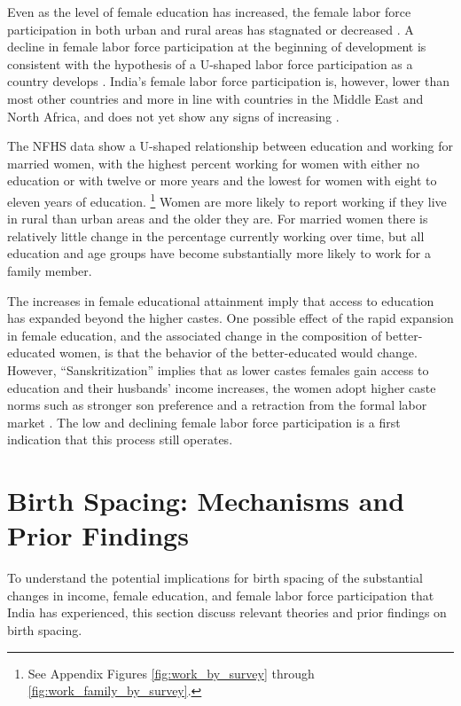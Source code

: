 \documentclass[12pt,letterpaper]{article}
\begin{document}
Even as the level of female education has increased, the female labor force participation 
in both urban and rural areas has stagnated or decreased
\citep{Klasen2015,Fletcher2017,Afridi2018,Bhargava2018,Chatterjee2018,Bhargava2019}.
A decline in female labor force participation at the beginning of development is
consistent with the hypothesis of a U-shaped labor force participation as a country
develops \citep{Goldin1994}.
India's female labor force participation is, however, lower than most other
countries and more in line with countries in the Middle East and North Africa, and
does not yet show any signs of increasing
\citep{Klasen2015,Chatterjee2018}.

The NFHS data show a U-shaped relationship between education and working for married
women, with the highest percent working for women with either no education 
or with twelve or more years and the lowest for women with eight to eleven years of 
education.%
\footnote{
See Appendix Figures \ref{fig:work_by_survey} through \ref{fig:work_family_by_survey}. 
}
Women are more likely to report working if they live in rural than urban areas 
and the older they are.
For married women there is relatively little change in the percentage currently working 
over time,
but all education and age groups have become substantially more likely to work for
a family member.

The increases in female educational attainment imply that access to education has 
expanded beyond the higher castes. 
One possible effect of the rapid expansion in female education, and the 
associated change in the composition of better-educated women, is that the behavior
of the better-educated would change. 
However, ``Sanskritization'' implies that as lower castes females gain access to 
education and their husbands' income increases, the women adopt higher caste 
norms such as stronger son preference and a retraction from the formal labor 
market \citep{Srinivas1956,Chen1995,Abraham2013,Chatterjee2018}.
The low and declining female labor force participation is a first indication that this
process still operates.


\section{Birth Spacing: Mechanisms and Prior Findings}

To understand the potential implications for birth spacing of the substantial changes in 
income, female education, and female labor force participation that India has experienced, 
this section discuss relevant theories and prior findings on birth spacing.
\end{document}
